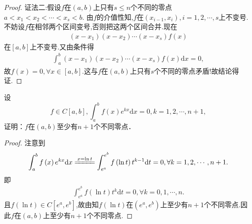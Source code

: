 \documentclass[../../main.tex]{subfiles}%
\begin{document}
\begin{proof}
{\color{blue}证法二:}假设$f$在$\left( a,b \right)$上只有$s\leqslant n$个不同的零点
$a<x_1<x_2<\cdots <x_s<b.$
由$f$的介值性知,$f$在$\left( x_{i-1},x_i \right) ,i=1,2,\cdots ,s$上不变号.
不妨设$f$在相邻两个区间变号,否则把这两个区间合并.现在
\begin{align*}
\left( x-x_1 \right) \left( x-x_2 \right) \cdots \left( x-x_s \right) f\left( x \right)
\end{align*}
在$\left[ a,b \right]$上不变号.又由条件得
\begin{align*}
\int_a^b{\left( x-x_1 \right) \left( x-x_2 \right) \cdots \left( x-x_s \right) f\left( x \right) \mathrm{d}x}=0,
\end{align*}
故$f\left( x \right) =0,\forall x\in \left[ a,b \right]$.这与$f$在$\left( a,b \right)$上只有$s$个不同的零点矛盾!故结论得证.

\end{proof}

\begin{example}
设
\[
f \in C[a,b], \int_a^b f(x)e^{kx}\mathrm{d}x = 0, k = 1,2,\cdots,n + 1,
\]
证明：$f$在$(a,b)$至少有$n + 1$个不同零点．
\end{example}
\begin{proof}

注意到
\begin{align*}
\int_a^b{f\left( x \right) e^{kx}\mathrm{d}x}\xlongequal{x=\ln t}\int_{e^a}^{e^b}{f\left( \ln t \right) t^{k-1}\mathrm{d}t}=0,\forall k=1,2,\cdots ,n+1.
\end{align*}
即
\begin{align*}
\int_{e^a}^{e^b}{f\left( \ln t \right) t^k\mathrm{d}t}=0,\forall k=0,1,\cdots ,n.
\end{align*}
且$f\left( \ln t \right) \in C\left[ e^a,e^b \right]$,故由知$f\left( \ln t \right)$在$\left( e^a,e^b \right)$上至少有$n+1$个不同零点.因此$f$在$\left( a,b \right)$上至少有$n+1$个不同零点.

\end{proof}
\end{document}
